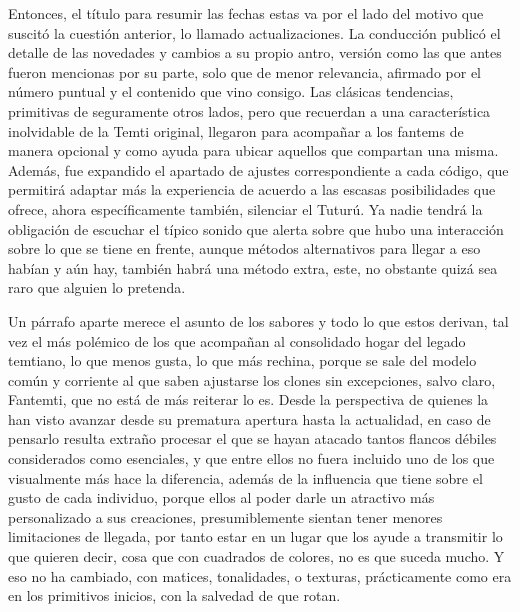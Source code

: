 \documentclass[
]{book}
\begin{document}
Entonces, el título para resumir las fechas estas va por el lado del motivo que suscitó la cuestión anterior, lo llamado actualizaciones. La conducción publicó el detalle de las novedades y cambios a su propio antro, versión como las que antes fueron mencionas por su parte, solo que de menor relevancia, afirmado por el número puntual y el contenido que vino consigo. Las clásicas tendencias, primitivas de seguramente otros lados, pero que recuerdan a una característica inolvidable de la Temti original, llegaron para acompañar a los fantems de manera opcional y como ayuda para ubicar aquellos que compartan una misma. Además, fue expandido el apartado de ajustes correspondiente a cada código, que permitirá adaptar más la experiencia de acuerdo a las escasas posibilidades que ofrece, ahora específicamente también, silenciar el Tuturú. Ya nadie tendrá la obligación de escuchar el típico sonido que alerta sobre que hubo una interacción sobre lo que se tiene en frente, aunque métodos alternativos para llegar a eso habían y aún hay, también habrá una método extra, este, no obstante quizá sea raro que alguien lo pretenda.

Un párrafo aparte merece el asunto de los sabores y todo lo que estos derivan, tal vez el más polémico de los que acompañan al consolidado hogar del legado temtiano, lo que menos gusta, lo que más rechina, porque se sale del modelo común y corriente al que saben ajustarse los clones sin excepciones, salvo claro, Fantemti, que no está de más reiterar lo es. Desde la perspectiva de quienes la han visto avanzar desde su prematura apertura hasta la actualidad, en caso de pensarlo resulta extraño procesar el que se hayan atacado tantos flancos débiles considerados como esenciales, y que entre ellos no fuera incluido uno de los que visualmente más hace la diferencia, además de la influencia que tiene sobre el gusto de cada individuo, porque ellos al poder darle un atractivo más personalizado a sus creaciones, presumiblemente sientan tener menores limitaciones de llegada, por tanto estar en un lugar que los ayude a transmitir lo que quieren decir, cosa que con cuadrados de colores, no es que suceda mucho. Y eso no ha cambiado, con matices, tonalidades, o texturas, prácticamente como era en los primitivos inicios, con la salvedad de que rotan.
\end{document}

